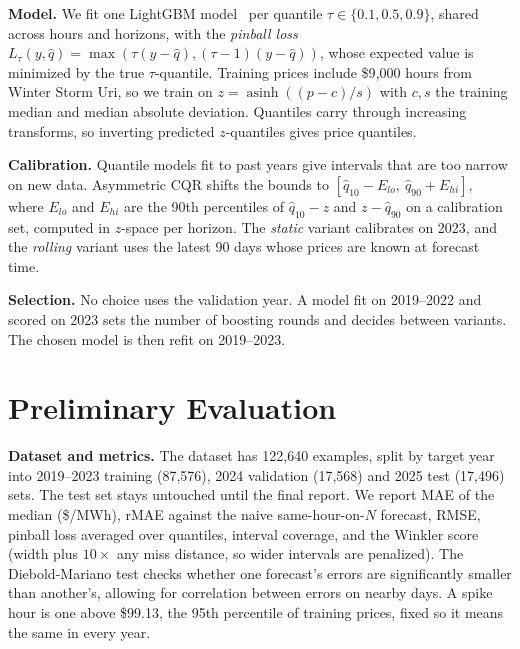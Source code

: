 \documentclass[11pt]{article}
\begin{document}
\textbf{Model.} We fit one LightGBM model~\cite{lgbm} per quantile $\tau \in \{0.1, 0.5, 0.9\}$, shared across hours and horizons, with the \emph{pinball loss} $L_\tau(y,\hat q)=\max(\tau(y-\hat q),(\tau-1)(y-\hat q))$, whose expected value is minimized by the true $\tau$-quantile. Training prices include \$9{,}000 hours from Winter Storm Uri, so we train on $z=\operatorname{asinh}((p-c)/s)$ with $c,s$ the training median and median absolute deviation. Quantiles carry through increasing transforms, so inverting predicted $z$-quantiles gives price quantiles.

\textbf{Calibration.} Quantile models fit to past years give intervals that are too narrow on new data. Asymmetric CQR shifts the bounds to $[\hat q_{10}-E_{lo},\ \hat q_{90}+E_{hi}]$, where $E_{lo}$ and $E_{hi}$ are the 90th percentiles of $\hat q_{10}-z$ and $z-\hat q_{90}$ on a calibration set, computed in $z$-space per horizon. The \emph{static} variant calibrates on 2023, and the \emph{rolling} variant uses the latest 90 days whose prices are known at forecast time.

\textbf{Selection.} No choice uses the validation year. A model fit on 2019--2022 and scored on 2023 sets the number of boosting rounds and decides between variants. The chosen model is then refit on 2019--2023.

\section{Preliminary Evaluation}

\textbf{Dataset and metrics.} The dataset has 122{,}640 examples, split by target year into 2019--2023 training (87{,}576), 2024 validation (17{,}568) and 2025 test (17{,}496) sets. The test set stays untouched until the final report. We report MAE of the median (\$/MWh), rMAE against the naive same-hour-on-$N$ forecast, RMSE, pinball loss averaged over quantiles, interval coverage, and the Winkler score (width plus $10\times$ any miss distance, so wider intervals are penalized). The Diebold-Mariano test checks whether one forecast's errors are significantly smaller than another's, allowing for correlation between errors on nearby days. A spike hour is one above \$99.13, the 95th percentile of training prices, fixed so it means the same in every year.
\end{document}
